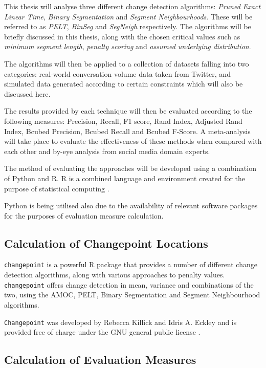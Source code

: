 \documentclass{uvamscse}	%
\begin{document}
This thesis will analyse three different change detection algorithms: \emph{Pruned Exact Linear Time}\cite{Killick2011a}, \emph{Binary Segmentation} \cite{Jackson2003} and \emph{Segment Neighbourhoods}\cite{Auger1989}. These will be referred to as \emph{PELT}, \emph{BinSeg} and \emph{SegNeigh} respectively. The algorithms will be briefly discussed in this thesis, along with the chosen critical values such as \emph{minimum segment length}, \emph{penalty scoring} and \emph{assumed underlying distribution}.

The algorithms will then be applied to a collection of datasets falling into two categories: real-world conversation volume data taken from Twitter, and simulated data generated according to certain constraints which will also be discussed here.

The results provided by each technique will then be evaluated according to the following measures: Precision, Recall, F1 score, Rand Index, Adjusted Rand Index, Bcubed Precision, Bcubed Recall and Bcubed F-Score. A meta-analysis will take place to evaluate the effectiveness of these methods when compared with each other and by-eye analysis from social media domain experts.

The method of evaluating the approaches will be developed using a combination of Python and \textsf{R}. \textsf{R} is a combined language and environment created for the purpose of statistical computing \cite{RCoreTeam2017}.

Python is being utilised also due to the availability of relevant software packages for the purposes of evaluation measure calculation.

\subsection{Calculation of Changepoint Locations}

\texttt{changepoint} is a powerful R package that provides a number of different change detection algorithms, along with various approaches to penalty values. \texttt{changepoint} offers change detection in mean, variance and combinations of the two, using the AMOC, PELT, Binary Segmentation and Segment Neighbourhood algorithms.

\texttt{Changepoint} was developed by Rebecca Killick and Idris A. Eckley and is provided free of charge under the GNU general public license \cite{Killick2014}.

\subsection{Calculation of Evaluation Measures}
\end{document}
